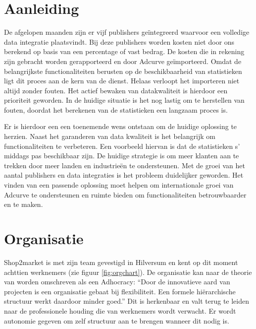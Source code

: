 \clearpage

\section{Aanleiding} %

De afgelopen maanden zijn er vijf publishers geïntegreerd waarvoor een volledige data integratie plaatsvindt. Bij deze publishers worden kosten niet door ons berekend op basis van een percentage of vast bedrag. De kosten die in rekening zijn gebracht worden gerapporteerd en door Adcurve geïmporteerd.
Omdat de belangrijkste functionaliteiten berusten op de beschikbaarheid van statistieken ligt dit proces aan de kern van de dienst. Helaas verloopt het importeren niet altijd zonder fouten. Het actief bewaken van datakwaliteit is hierdoor een prioriteit geworden. In de huidige situatie is het nog lastig om te herstellen van fouten, doordat het berekenen van de statistieken een langzaam proces is.

Er is hierdoor een een toenemende wens ontstaan om de huidige oplossing te herzien. Naast het garanderen van data kwaliteit is het belangrijk om functionaliteiten te verbeteren. Een voorbeeld hiervan is dat de statistieken s' middags pas beschikbaar zijn. De huidige strategie is om meer klanten aan te trekken door meer landen en industrieën te ondersteunen. Met de groei van het aantal publishers en data integraties is het probleem duidelijker geworden. Het vinden van een passende oplossing moet helpen om internationale groei van Adcurve te ondersteunen en ruimte bieden om functionaliteiten betrouwbaarder en te maken.

\section{Organisatie} %

Shop2market is met zijn team gevestigd in Hilversum en kent op dit moment achttien werknemers (zie figuur \ref{fig:orgchart}). De organisatie kan naar de theorie van
\autocite{mintzberg} worden omschreven als een Adhocracy: “Door de innovatieve aard van projecten is een organisatie gebaat bij flexibiliteit. Een formele hiërarchische structuur werkt daardoor minder goed.” Dit is herkenbaar en valt terug te leiden naar de professionele houding die van werknemers wordt verwacht. Er wordt autonomie gegeven om zelf structuur aan te brengen wanneer dit nodig is.

